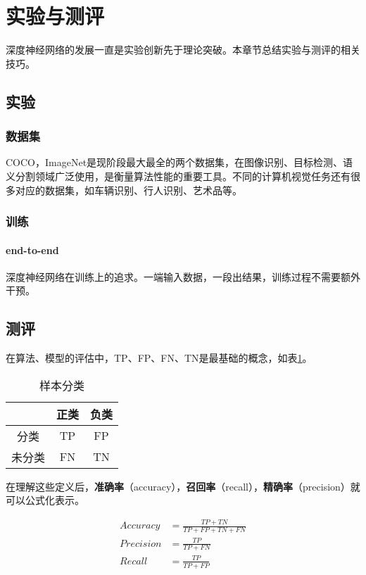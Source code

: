\section{实验与测评}

深度神经网络的发展一直是实验创新先于理论突破。本章节总结实验与测评的相关技巧。

\subsection{实验}

\subsubsection{数据集}
COCO，ImageNet是现阶段最大最全的两个数据集，在图像识别、目标检测、语义分割领域广泛使用，是衡量算法性能的重要工具。不同的计算机视觉任务还有很多对应的数据集，如车辆识别、行人识别、艺术品等。

\subsubsection{训练}
\paragraph{end-to-end}
深度神经网络在训练上的追求。一端输入数据，一段出结果，训练过程不需要额外干预。

\subsection{测评}
在算法、模型的评估中，TP、FP、FN、TN是最基础的概念，如表\ref{tab:table1}。
\begin{table}[!htbp]  
\centering
\caption{样本分类}
\label{tab:table1}%
\begin{tabular}{ccc}  
\hline  
 & 正类 & 负类\\
\hline  
分类   & TP & FP\\
未分类 & FN & TN\\
\hline  
\end{tabular}  
\end{table}

在理解这些定义后，\textbf{准确率}（accuracy），\textbf{召回率}（recall），\textbf{精确率}（precision）就可以公式化表示。

\begin{align*}
Accuracy &= {\frac{TP+TN}{TP+FP+TN+FN}} \\
Precision &= {\frac{TP}{TP+FN}} \\
Recall &= {\frac{TP}{TP+FP}} 
\end{align*}

